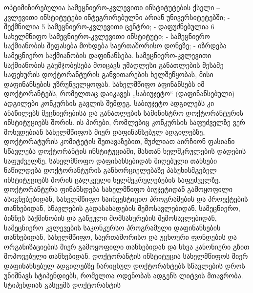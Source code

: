  ოპტიმიზირებულია სამეცნიერო-კვლევითი ინსტიტუტების ქსელი  – კვლევითი ინსტიტუტები ინტეგრირებულნი არიან უნივერსიტეტებში;
-	შექმნილია 5 სამეცნიერო-კვლევითი ცენტრი;
-	დაფუძნებულია 6 სახელმწიფო სამეცნიერო-კვლევითი ინსტიტუტი;
-	სამეცნიერო საქმიანობის შეფასება მოხდება საერთაშორისო დონეზე;
-	იზრდება სამეცნიერო საქმიანობის დაფინანსება.
სამეცნიერო-კვლევითი საქმიანობის გაუმჯობესება მოიცავს უმაღლესი განათლების მესამე საფეხურის დოქტორანტურის განვითარების ხელშეწყობას, მისი დაფინანსების უზრუნველყოფას. სახელმწიფო აფინანსებს იმ დოქტორანტებს, რომელთაც დაიკავეს „საბიუჯეტო“ (დაფინანსებული) ადგილები კონკურსის გავლის შემდეგ. საბიუჯეტო ადგილებს კი ანაწილებს მეცნიერებისა და განათლების სამინისტრო დოქტორანტურის ინსტიტუციებს  შორის. ის პირები, რომლებიც კონკურსის საფუძველზე ვერ მოხვდებიან სახელმწიფოს მიერ დაფინანსებულ ადგილებზე, დოქტორატურის კომიტეტის  შეთავაზებით, შუძლიათ აირჩიონ ფასიანი სწავლება დოქტორანტის ინსტიტუციაში, მასთან ხელშკრულების დადების საფუძველზე.  
სახელმწოფო დაფინანსებიდან მიღებული თანხები ნაწილდება დოქტორანტურის განხორციელებაზე პასუხისმგებელ ინსტიტუციებს შორის ცალკეული ხელშეკრულებების საფუძველზე. დოქტორანტურა ფინანსდება სახელმწიფო ბიუჯეტიდან გამოყოფილი ასიგნებებიდან, სახელმწიფო საინვესტიციო პროგრამების და პროექტების თანხებიდან, სწავლების გადასახადების შემოსავლებიდან, სამეცნიერო, ბიზნეს-საქმინობის და გაწეული მომსახურების შემოსავლებიდან, სამეცნიერო კვლევების საკონკურსო პროგრამული დაფინანსების თანხებიდან, სახელმწიფო, საერთაშორისო და უცხოური ფონდების და ორგანიზაციების მიერ გამოყოფილი თანხებიდან და სხვა კანონიერი გზით მოპოვებული თანხებიდან.
დოქტორანტის ინსტიტუცია სახელმწიფოს მიერ დაფინანსებულ ადგილებზე ჩარიცხულ დოქტორანტებს სწავლების დროს უნიშნავს სტიპენდიებს, რომელთა ოდენობას ადგენს ლიტვის მთავრობა. სტიპენდიას გასცემს დოქტორანტის 
